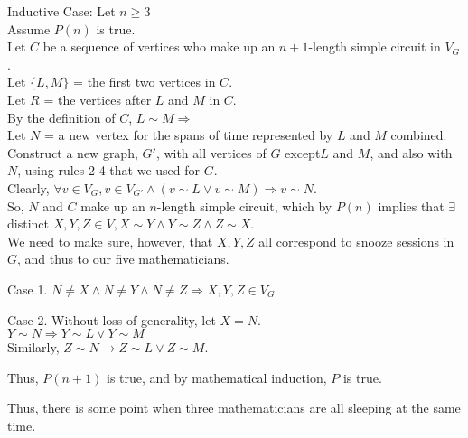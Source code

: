 \documentclass[fleqn]{article}
\begin{document}
Inductive Case: Let $n \geq 3$\\
Assume $P(n)$ is true.\\
Let $C$ be a sequence of vertices who make up an $n+1$-length simple circuit in $V_G$.\\
Let $\lbrace L,M \rbrace$ = the first two vertices in $C$.\\
Let $R$ = the vertices after $L$ and $M$ in $C$.\\
By the definition of $C$, $L \sim M \Rightarrow$\\
Let $N$ = a new vertex for the spans of time represented by $L$ and $M$ combined.\\
Construct a new graph, $G'$, with all vertices of $G$ except$L$ and $M$, and also with $N$, using rules 2-4 that we used for $G$.\\
Clearly, $\forall v \in V_G, v \in V_{G'} \wedge (v \sim L \vee v \sim M)
          \Rightarrow v \sim N$.\\
So, $N$ and $C$ make up an $n$-length simple circuit, which by $P(n)$ implies that $\exists$ distinct $X,Y,Z \in V,
              X \sim Y \wedge Y \sim Z \wedge Z \sim X$.\\
We need to make sure, however, that $X,Y,Z$ all correspond to snooze sessions in $G$, and thus to our five mathematicians.

Case 1. $N \not= X \wedge N \not= Y \wedge N \not= Z \Rightarrow
        X,Y,Z \in V_G$

Case 2. Without loss of generality, let $X = N$.\\
        $Y \sim N \Rightarrow Y \sim L \vee Y \sim M$\\
        Similarly, $Z \sim N \rightarrow Z \sim L \vee Z \sim M$.

Thus, $P(n+1)$ is true, and by mathematical induction, $P$ is true.

Thus, there is some point when three mathematicians are all sleeping at the same time.
\end{document}
